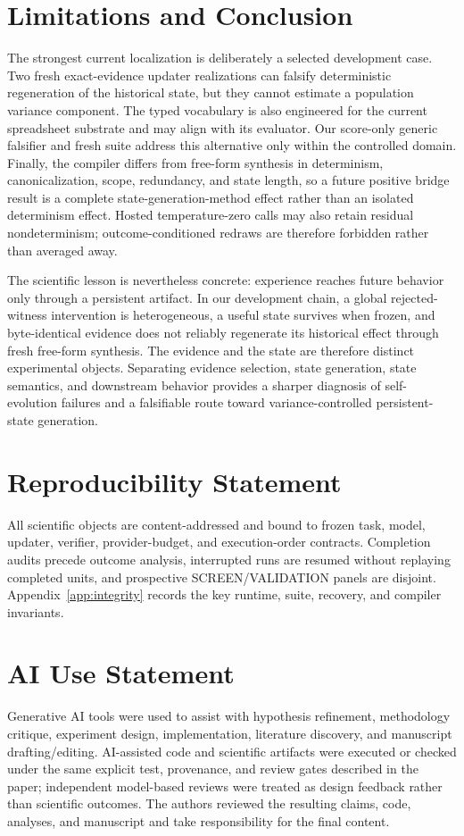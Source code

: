 \section{Limitations and Conclusion}

The strongest current localization is deliberately a selected development case. Two fresh exact-evidence updater realizations can falsify deterministic regeneration of the historical state, but they cannot estimate a population variance component. The typed vocabulary is also engineered for the current spreadsheet substrate and may align with its evaluator. Our score-only generic falsifier and fresh suite address this alternative only within the controlled domain. Finally, the compiler differs from free-form synthesis in determinism, canonicalization, scope, redundancy, and state length, so a future positive bridge result is a complete state-generation-method effect rather than an isolated determinism effect. Hosted temperature-zero calls may also retain residual nondeterminism; outcome-conditioned redraws are therefore forbidden rather than averaged away.

The scientific lesson is nevertheless concrete: experience reaches future behavior only through a persistent artifact. In our development chain, a global rejected-witness intervention is heterogeneous, a useful state survives when frozen, and byte-identical evidence does not reliably regenerate its historical effect through fresh free-form synthesis. The evidence and the state are therefore distinct experimental objects. Separating evidence selection, state generation, state semantics, and downstream behavior provides a sharper diagnosis of self-evolution failures and a falsifiable route toward variance-controlled persistent-state generation.

\section*{Reproducibility Statement}
All scientific objects are content-addressed and bound to frozen task, model, updater, verifier, provider-budget, and execution-order contracts. Completion audits precede outcome analysis, interrupted runs are resumed without replaying completed units, and prospective SCREEN/VALIDATION panels are disjoint. Appendix~\ref{app:integrity} records the key runtime, suite, recovery, and compiler invariants.

\section*{AI Use Statement}
Generative AI tools were used to assist with hypothesis refinement, methodology critique, experiment design, implementation, literature discovery, and manuscript drafting/editing. AI-assisted code and scientific artifacts were executed or checked under the same explicit test, provenance, and review gates described in the paper; independent model-based reviews were treated as design feedback rather than scientific outcomes. The authors reviewed the resulting claims, code, analyses, and manuscript and take responsibility for the final content.
